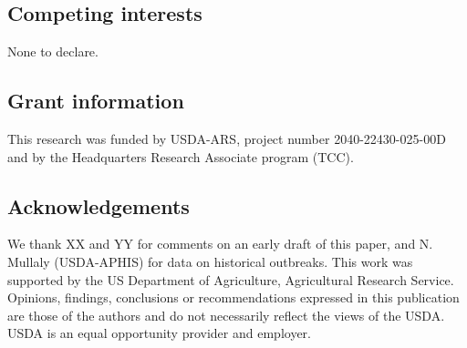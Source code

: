 \documentclass[10pt,a4paper,twocolumn]{article}
\begin{document}
\subsection*{Competing interests}
None to declare.

\subsection*{Grant information}
This research was funded by USDA-ARS, project number 2040-22430-025-00D and by the Headquarters 
Research Associate program (TCC).

\subsection*{Acknowledgements}
We thank XX and YY for comments on an early draft of this paper, and N. Mullaly (USDA-APHIS) for 
data on historical outbreaks. This work was supported by the US Department of Agriculture, Agricultural Research Service. Opinions, findings, conclusions or recommendations expressed in this publication are those of the authors and do not necessarily reflect the views of the USDA. USDA is an equal opportunity provider and employer.

{\small
}









\end{document}
